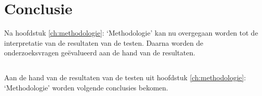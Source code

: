 
\chapter{Conclusie}
\label{ch:conclusie}


Na hoofdstuk \ref{ch:methodologie}: `Methodologie' kan nu overgegaan worden tot de interpretatie van de resultaten van de testen. Daarna worden de onderzoeksvragen geëvalueerd aan de hand van de resultaten. 


\section{}
\label{sec:C-conclusie-resulaten}
Aan de hand van de resultaten van de testen uit hoofdstuk \ref{ch:methodologie}: `Methodologie' worden volgende conclusies bekomen.

